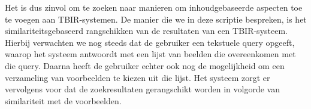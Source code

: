 Het is dus zinvol om te zoeken naar manieren om inhoudgebaseerde aspecten toe te voegen aan
TBIR-systemen. De manier die we in deze scriptie bespreken, is het 
similariteitsgebaseerd rangschikken van de resultaten van een TBIR-systeem. Hierbij verwachten we
nog steeds dat de gebruiker een tekstuele query opgeeft, waarop het systeem antwoordt met een 
lijst van beelden die overeenkomen met die query. Daarna heeft de gebruiker echter ook nog 
de mogelijkheid om een verzameling van voorbeelden te kiezen uit die lijst. Het 
systeem zorgt er vervolgens voor dat de zoekresultaten gerangschikt worden in 
volgorde van similariteit met de voorbeelden.

